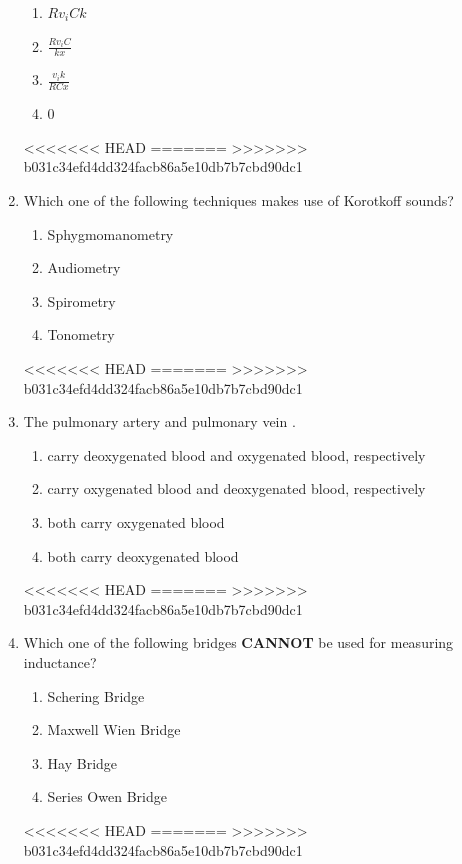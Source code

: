 \documentclass[journal]{IEEEtran}
\begin{document}
\begin{enumerate}
\begin{enumerate}
    \item \( Rv_i Ck \)
    \item \( \frac{Rv_i C}{kx} \)
    \item \( \frac{v_i k}{RCx} \)
    \item \(0\)
\end{enumerate}
<<<<<<< HEAD
\hfill{}
=======
\hfill{}
>>>>>>> b031c34efd4dd324facb86a5e10db7b7cbd90dc1

\item  Which one of the following techniques makes use of Korotkoff sounds?

\begin{enumerate}[label=(\Alph*)]
    \item Sphygmomanometry 
    \item Audiometry
    \item Spirometry
    \item Tonometry
\end{enumerate}
<<<<<<< HEAD
\hfill{}
=======
\hfill{}
>>>>>>> b031c34efd4dd324facb86a5e10db7b7cbd90dc1

\item  The pulmonary artery and pulmonary vein \underline{\hspace{3cm}}.
\begin{enumerate}[label=(\Alph*)]
    \item carry deoxygenated blood and oxygenated blood, respectively 
    \item carry oxygenated blood and deoxygenated blood, respectively
    \item both carry oxygenated blood
    \item both carry deoxygenated blood
\end{enumerate}
<<<<<<< HEAD
\hfill{}
=======
\hfill{}
>>>>>>> b031c34efd4dd324facb86a5e10db7b7cbd90dc1

\item  Which one of the following bridges \textbf{CANNOT} be used for measuring inductance?

\begin{enumerate}[label=(\Alph*)]
    \item Schering Bridge 
    \item Maxwell Wien Bridge
    \item Hay Bridge
    \item Series Owen Bridge
\end{enumerate}
<<<<<<< HEAD
\hfill{}
=======
\hfill{}
>>>>>>> b031c34efd4dd324facb86a5e10db7b7cbd90dc1



\end{enumerate}
\end{document}

